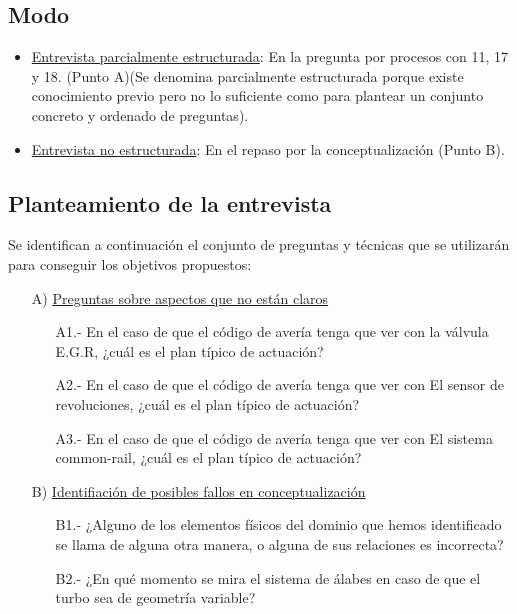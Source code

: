 \documentclass[a4paper,12pt]{article}
\begin{document}
 \subsection{Modo}
 \begin{itemize}
 \item \underline{Entrevista parcialmente estructurada}: En la pregunta por procesos con 11, 17 y 18. (Punto A)(Se denomina parcialmente estructurada porque existe conocimiento previo pero no lo suficiente como para plantear un conjunto concreto y ordenado de preguntas).
 \item \underline{Entrevista no estructurada}: En el repaso por la conceptualización (Punto B).
 \end{itemize}
 
 \subsection{Planteamiento de la entrevista}
 Se identifican a continuación el conjunto de preguntas y técnicas que se utilizarán para conseguir los objetivos propuestos:
 
 \begin{itemize}
 \item[A)] \underline{Preguntas sobre aspectos que no están claros}
 \begin{itemize}
 \item[A1.-] En el caso de que el código de avería tenga que ver con la válvula E.G.R, ¿cuál es el plan típico de actuación?
 \item[A2.-] En el caso de que el código de avería tenga que ver con El sensor de revoluciones, ¿cuál es el plan típico de actuación?
 \item[A3.-] En el caso de que el código de avería tenga que ver con El sistema common-rail, ¿cuál es el plan típico de actuación?
 \end{itemize}
 \item[B)] \underline{Identifiación de posibles fallos en conceptualización}
 \begin{itemize}
 \item[B1.-] ¿Alguno de los elementos físicos del dominio que hemos identificado se llama de alguna otra manera, o alguna de sus relaciones es incorrecta?
 \item[B2.-] ¿En qué momento se mira el sistema de álabes en caso de que el turbo sea de geometría variable?
 \end{itemize}
 \end{itemize}
 
\end{document}
